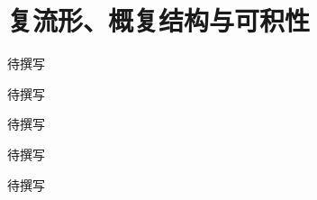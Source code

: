 
% 
% 

\chapter{复流形、概复结构与可积性}
\label{g4:ch:15}

\begin{chapterabstract}
待撰写
\end{chapterabstract}

\begin{learninggoals}
待撰写
\end{learninggoals}

待撰写






\begin{chaptersummary}
待撰写
\end{chaptersummary}

\BookExercises
待撰写
